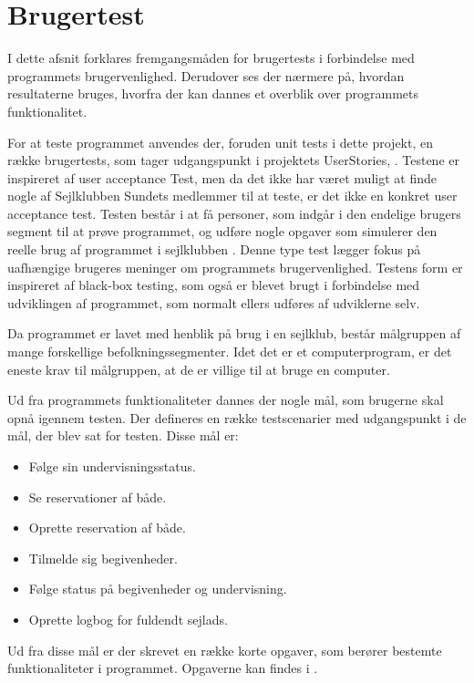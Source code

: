 \section{Brugertest}
I dette afsnit forklares fremgangsmåden for brugertests i forbindelse med programmets brugervenlighed.
Derudover ses der nærmere på, hvordan resultaterne bruges, hvorfra der kan dannes et overblik over programmets funktionalitet. 

For at teste programmet anvendes der, foruden unit tests i dette projekt, en række brugertests, som tager udgangspunkt i projektets UserStories, .
Testene er inspireret af user acceptance Test, men da det ikke har været muligt at finde nogle af Sejlklubben Sundets medlemmer til at teste, er det ikke en konkret user acceptance test. 
Testen består i at få personer, som indgår i den endelige brugers segment til at prøve programmet, og udføre nogle opgaver som simulerer den reelle brug af programmet i sejlklubben \citep{UAT}.
Denne type test lægger fokus på uafhængige brugeres meninger om programmets brugervenlighed.
Testens form er inspireret af black-box testing, som også er blevet brugt i forbindelse med udviklingen af programmet, som normalt ellers udføres af udviklerne selv.

Da programmet er lavet med henblik på brug i en sejlklub, består målgruppen af mange forskellige befolkningssegmenter. 
Idet det er et computerprogram, er det eneste krav til målgruppen, at de er villige til at bruge en computer.

Ud fra programmets funktionaliteter dannes der nogle mål, som brugerne skal opnå igennem testen. 
Der defineres en række testscenarier med udgangspunkt i de mål, der blev sat for testen.
Disse mål er:
\begin{itemize}
  \item Følge sin undervisningsstatus.
  \item Se reservationer af både.
  \item Oprette reservation af både.
  \item Tilmelde sig begivenheder.
  \item Følge status på begivenheder og undervisning.
  \item Oprette logbog for fuldendt sejlads.
\end{itemize}

Ud fra disse mål er der skrevet en række korte opgaver, som berører bestemte funktionaliteter i programmet. 
Opgaverne kan findes i .

